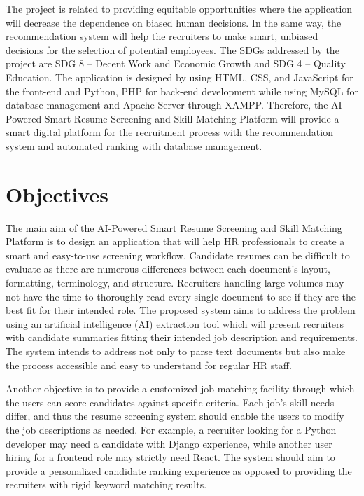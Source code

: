 \documentclass[12pt,a4paper]{report}
\begin{document}
The project is related to providing equitable opportunities where the application will decrease the dependence on biased human decisions. In the same way, the recommendation system will help the recruiters to make smart, unbiased decisions for the selection of potential employees. The SDGs addressed by the project are SDG 8 – Decent Work and Economic Growth and SDG 4 – Quality Education. The application is designed by using HTML, CSS, and JavaScript for the front-end and Python, PHP for back-end development while using MySQL for database management and Apache Server through XAMPP. Therefore, the AI-Powered Smart Resume Screening and Skill Matching Platform will provide a smart digital platform for the recruitment process with the recommendation system and automated ranking with database management.

\section{Objectives}

The main aim of the AI-Powered Smart Resume Screening and Skill Matching Platform is to design an application that will help HR professionals to create a smart and easy-to-use screening workflow. Candidate resumes can be difficult to evaluate as there are numerous differences between each document's layout, formatting, terminology, and structure. Recruiters handling large volumes may not have the time to thoroughly read every single document to see if they are the best fit for their intended role. The proposed system aims to address the problem using an artificial intelligence (AI) extraction tool which will present recruiters with candidate summaries fitting their intended job description and requirements. The system intends to address not only to parse text documents but also make the process accessible and easy to understand for regular HR staff.

Another objective is to provide a customized job matching facility through which the users can score candidates against specific criteria. Each job's skill needs differ, and thus the resume screening system should enable the users to modify the job descriptions as needed. For example, a recruiter looking for a Python developer may need a candidate with Django experience, while another user hiring for a frontend role may strictly need React. The system should aim to provide a personalized candidate ranking experience as opposed to providing the recruiters with rigid keyword matching results.
\end{document}
